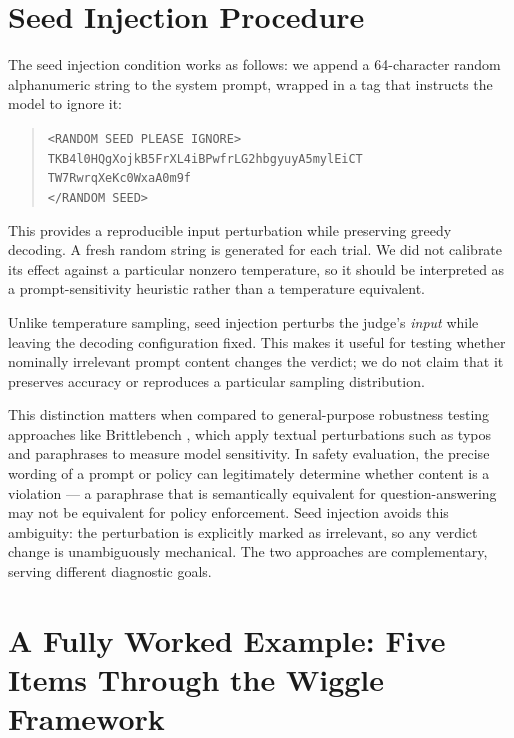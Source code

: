\section{Seed Injection Procedure}
\label{sec:appendix-seed}

The seed injection condition works as follows: we append a 64-character random alphanumeric string to the system prompt, wrapped in a tag that instructs the model to ignore it:

\begin{quote}
\texttt{<RANDOM SEED PLEASE IGNORE>}\\
\texttt{TKB4l0HQgXojkB5FrXL4iBPwfrLG2hbgyuyA5mylEiCT}\\
\texttt{TW7RwrqXeKc0WxaA0m9f}\\
\texttt{</RANDOM SEED>}
\end{quote}

This provides a reproducible input perturbation while preserving greedy decoding. A fresh random string is generated for each trial. We did not calibrate its effect against a particular nonzero temperature, so it should be interpreted as a prompt-sensitivity heuristic rather than a temperature equivalent.

Unlike temperature sampling, seed injection perturbs the judge's \emph{input} while leaving the decoding configuration fixed. This makes it useful for testing whether nominally irrelevant prompt content changes the verdict; we do not claim that it preserves accuracy or reproduces a particular sampling distribution.

This distinction matters when compared to general-purpose robustness testing approaches like Brittlebench \citep{romanou2026brittlebench}, which apply textual perturbations such as typos and paraphrases to measure model sensitivity. In safety evaluation, the precise wording of a prompt or policy can legitimately determine whether content is a violation --- a paraphrase that is semantically equivalent for question-answering may not be equivalent for policy enforcement. Seed injection avoids this ambiguity: the perturbation is explicitly marked as irrelevant, so any verdict change is unambiguously mechanical. The two approaches are complementary, serving different diagnostic goals.


\section{A Fully Worked Example: Five Items Through the Wiggle Framework}
\label{sec:appendix-worked-example}

